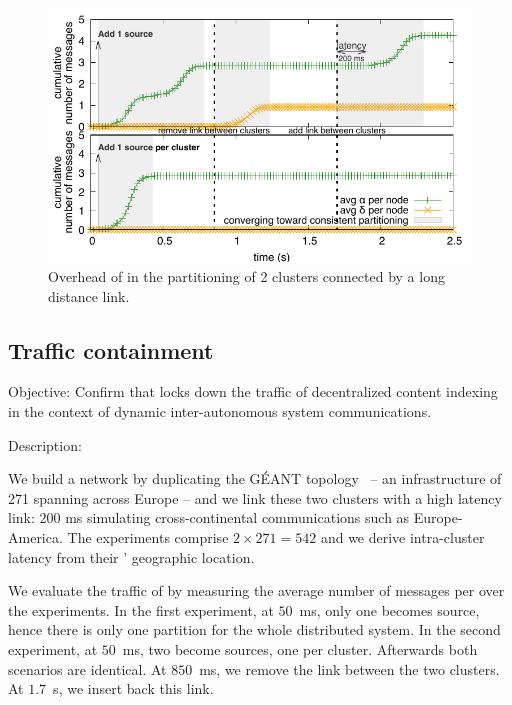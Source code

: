 \begin{asparadesc}

\begin{figure}
  \centering\includegraphics[width=\FIGSCALE\columnwidth]{img/as_cast_geant.pdf}
  \caption{\label{fig:geant}Overhead of \NAME in the partitioning of 2
    clusters connected by a long distance link.}
\end{figure}


\subsection{Traffic containment}
\item [Objective:] Confirm that \NAME locks down the traffic of
  decentralized content indexing in the context of dynamic
  inter-autonomous system communications.
  
\item [Description:]

We build a network by duplicating the G{\'E}ANT
topology~\cite{knight2011internet} -- an infrastructure of 271 \nodes
spanning across Europe -- and we link these two clusters with a high
latency link: $200$ ms simulating cross-continental communications
such as Europe-America. The experiments comprise $2 \times 271 = 542$
\processes and we derive intra-cluster latency from their \processes'
geographic location.

\noindent We evaluate the traffic of \NAME by measuring the average
number of messages per \process over the experiments. In the first
experiment, at $50$~ms, only one \process becomes source, hence there
is only one partition for the whole distributed system. In the second
experiment, at $50$~ms, two \processes become sources, one per
cluster. Afterwards both scenarios are identical. At $850$~ms, we
remove the link between the two clusters. At $1.7$~s, we insert back
this link.


\end{asparadesc}
